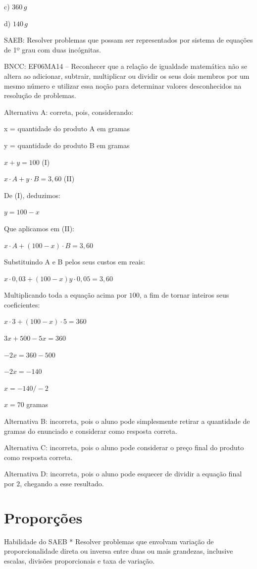 c) $360\,g$

d) $140\,g$

SAEB: Resolver problemas que possam ser representados por sistema de
equações de 1º grau com duas incógnitas.

BNCC: EF06MA14 -- Reconhecer que a relação de igualdade matemática não
se altera ao adicionar, subtrair, multiplicar ou dividir os seus dois
membros por um mesmo número e utilizar essa noção para determinar
valores desconhecidos na resolução de problemas.

Alternativa A: correta, pois, considerando:

x = quantidade do produto A em gramas

y = quantidade do produto B em gramas

$x + y = 100$ (I)

$x·A + y·B = 3,60$ (II)

De (I), deduzimos:

$y = 100 - x$

Que aplicamos em (II):

$x·A + (100-x)·B = 3,60$

Substituindo A e B pelos seus custos em reais:

$x·0,03 + (100-x)y·0,05 = 3,60$

Multiplicando toda a equação acima por $100$, a fim de tornar inteiros
seus coeficientes:

$x·3 + (100-x)·5 = 360$

$3x + 500 - 5x = 360$

$-2x = 360 - 500$

$-2x = -140$

$x = -140/-2$

$x = 70$ gramas

Alternativa B: incorreta, pois o aluno pode simplesmente retirar a
quantidade de gramas do enunciado e considerar como resposta correta.

Alternativa C: incorreta, pois o aluno pode considerar o preço final do
produto como resposta correta.

Alternativa D: incorreta, pois o aluno pode esquecer de dividir a
equação final por $2$, chegando a esse resultado.



\chapter{Proporções}

Habilidade do SAEB * Resolver problemas que envolvam variação de
proporcionalidade direta ou inversa entre duas ou mais grandezas,
inclusive escalas, divisões proporcionais e taxa de variação.

